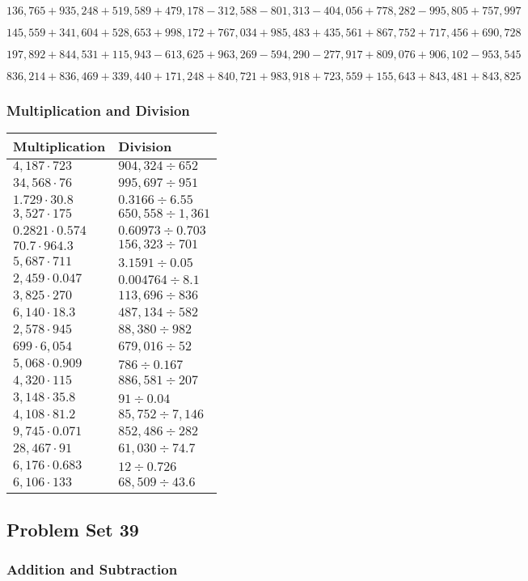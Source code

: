 \(136,765+935,248+519,589+479,178-312,588-801,313-404,056+778,282-995,805+757,997\)

\(145,559+341,604+528,653+998,172+767,034+985,483+435,561+867,752+717,456+690,728\)

\(197,892+844,531+115,943-613,625+963,269-594,290-277,917+809,076+906,102-953,545\)

\(836,214+836,469+339,440+171,248+840,721+983,918+723,559+155,643+843,481+843,825\)

\hypertarget{multiplication-and-division-342}{%
\subsubsection{Multiplication and
Division}\label{multiplication-and-division-342}}

\begin{longtable}[]{@{}ll@{}}
\toprule
Multiplication & Division\tabularnewline
\midrule
\endhead
\(4,187\cdot723\) & \(904,324÷652\)\tabularnewline
\(34,568\cdot76\) & \(995,697÷951\)\tabularnewline
\(1.729\cdot30.8\) & \(0.3166÷6.55\)\tabularnewline
\(3,527\cdot175\) & \(650,558÷1,361\)\tabularnewline
\(0.2821\cdot0.574\) & \(0.60973÷0.703\)\tabularnewline
\(70.7\cdot964.3\) & \(156,323÷701\)\tabularnewline
\(5,687\cdot711\) & \(3.1591÷0.05\)\tabularnewline
\(2,459\cdot0.047\) & \(0.004764÷8.1\)\tabularnewline
\(3,825\cdot270\) & \(113,696÷836\)\tabularnewline
\(6,140\cdot18.3\) & \(487,134÷582\)\tabularnewline
\(2,578\cdot945\) & \(88,380÷982\)\tabularnewline
\(699\cdot6,054\) & \(679,016÷52\)\tabularnewline
\(5,068\cdot0.909\) & \(786÷0.167\)\tabularnewline
\(4,320\cdot115\) & \(886,581÷207\)\tabularnewline
\(3,148\cdot35.8\) & \(91÷0.04\)\tabularnewline
\(4,108\cdot81.2\) & \(85,752÷7,146\)\tabularnewline
\(9,745\cdot0.071\) & \(852,486÷282\)\tabularnewline
\(28,467\cdot91\) & \(61,030÷74.7\)\tabularnewline
\(6,176\cdot0.683\) & \(12÷0.726\)\tabularnewline
\(6,106\cdot133\) & \(68,509÷43.6\)\tabularnewline
\bottomrule
\end{longtable}

\hypertarget{problem-set-39-5}{%
\subsection{Problem Set 39}\label{problem-set-39-5}}

\hypertarget{addition-and-subtraction-344}{%
\subsubsection{Addition and
Subtraction}\label{addition-and-subtraction-344}}

